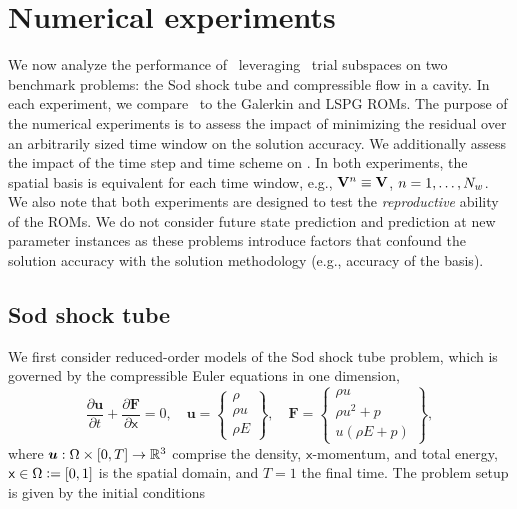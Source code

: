 \section{Numerical experiments}\label{sec:numerical_experiments}
We now analyze the performance of \methodAcronymROMs\ leveraging \spatialAcronym\ trial subspaces on two benchmark problems: the Sod shock tube and compressible flow in a cavity. In each experiment, we compare \methodAcronymROMs\ to the Galerkin and LSPG ROMs. The purpose of the numerical experiments is to assess the impact of minimizing the residual over an arbitrarily sized time window on the solution accuracy. We additionally assess the impact of the time step and time scheme on \methodAcronym. In both experiments, the spatial basis is equivalent for each time window, e.g., $\mathbf {V}^{n} \equiv \mathbf {V}$, $n=1,\ldots,N_w$. We also note that both experiments are designed to test the \textit{reproductive} ability of the ROMs. We do not consider future state prediction and prediction at new parameter instances as these problems introduce factors that confound the solution accuracy with the solution methodology (e.g., accuracy of the basis). 
 
\subsection{Sod shock tube}
We first consider reduced-order models of the Sod shock tube problem, which is governed by the compressible Euler equations in one dimension, 
\begin{equation}\label{eq:euler_1D}
    \frac{\partial \boldsymbol u}{\partial t} + \frac{\partial \boldsymbol F}{\partial \mathsf{x}} = 0, \quad
    \boldsymbol u= 
    \begin{Bmatrix} \rho \\ \rho u \\ \rho E \end{Bmatrix}, \quad 
    \boldsymbol F = \begin{Bmatrix} \rho u \\ \rho u^2 + p \\  u(\rho E + p) \end{Bmatrix},
\end{equation}
where $\boldsymbol u : \Omega \times [0,T] \rightarrow \mathbb{R}^{3}$ comprise the density, $\mathsf{x}$-momentum, and total energy, $\mathsf{x} \in \Omega \vcentcolon=  [0,1]$ is the spatial domain, and 
$T = 1$ the final time. 
The problem setup is given by the initial conditions

